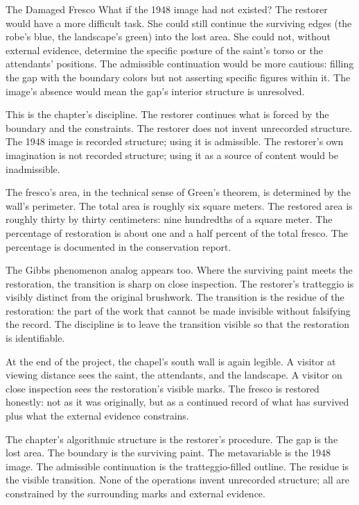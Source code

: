 \begin{coda}{The Damaged Fresco}
What if the 1948 image had not existed? The restorer would have a
more difficult task. She could still continue the surviving
edges (the robe's blue, the landscape's green) into the lost
area. She could not, without external evidence, determine the
specific posture of the saint's torso or the attendants'
positions. The admissible continuation would be more cautious:
filling the gap with the boundary colors but not asserting
specific figures within it. The image's absence would mean the
gap's interior structure is unresolved.

This is the chapter's discipline. The restorer continues what is
forced by the boundary and the constraints. The restorer does
not invent unrecorded structure. The 1948 image is recorded
structure; using it is admissible. The restorer's own
imagination is not recorded structure; using it as a source of
content would be inadmissible.

The fresco's area, in the technical sense of Green's theorem, is
determined by the wall's perimeter. The total area is roughly
six square meters. The restored area is roughly thirty by thirty
centimeters: nine hundredths of a square meter. The percentage
of restoration is about one and a half percent of the total
fresco. The percentage is documented in the conservation
report.

The Gibbs phenomenon analog appears too. Where the surviving
paint meets the restoration, the transition is sharp on close
inspection. The restorer's tratteggio is visibly distinct from
the original brushwork. The transition is the residue of the
restoration: the part of the work that cannot be made invisible
without falsifying the record. The discipline is to leave the
transition visible so that the restoration is identifiable.

At the end of the project, the chapel's south wall is again
legible. A visitor at viewing distance sees the saint, the
attendants, and the landscape. A visitor on close inspection sees
the restoration's visible marks. The fresco is restored honestly:
not as it was originally, but as a continued record of what has
survived plus what the external evidence constrains.

The chapter's algorithmic structure is the restorer's procedure.
The gap is the lost area. The boundary is the surviving paint.
The metavariable is the 1948 image. The admissible continuation
is the tratteggio-filled outline. The residue is the visible
transition. None of the operations invent unrecorded structure;
all are constrained by the surrounding marks and external evidence.

\end{coda}
